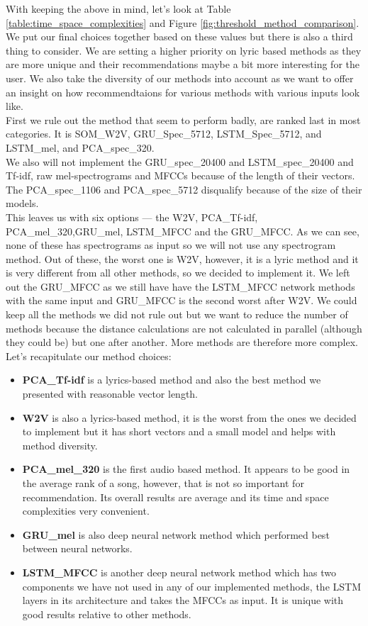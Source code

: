 With keeping the above in mind, let's look at Table \ref{table:time_space_complexities} and Figure \ref{fig:threshold_method_comparison}. We put our final choices together based on these values but there is also a third thing to consider. We are setting a higher priority on lyric based methods as they are more unique and their recommendations maybe a bit more interesting for the user. We also take the diversity of our methods into account as we want to offer an insight on how recommendtaions for various methods with various inputs look like. \\
First we rule out the method that seem to perform badly, are ranked last in most categories. It is SOM\_W2V, GRU\_Spec\_5712, LSTM\_Spec\_5712, and LSTM\_mel, and PCA\_spec\_320. \\
We also will not implement the GRU\_spec\_20400 and LSTM\_spec\_20400 and Tf-idf, raw mel-spectrograms and MFCCs because of the length of their vectors. The PCA\_spec\_1106 and PCA\_spec\_5712 disqualify because of the size of their models. \\
This leaves us with six options --- the W2V, PCA\_Tf-idf, PCA\_mel\_320,GRU\_mel, LSTM\_MFCC and the GRU\_MFCC. As we can see, none of these has spectrograms as input so we will not use any spectrogram method. Out of these, the worst one is W2V, however, it is a lyric method and it is very different from all other methods, so we decided to implement it. We left out the GRU\_MFCC as we still have have the LSTM\_MFCC network methods with the same input and GRU\_MFCC is the second worst after W2V. We could keep all the methods we did not rule out but we want to reduce the number of methods because the distance calculations are not calculated in parallel (although they could be) but one after another. More methods are therefore more complex. \\
Let's recapitulate our method choices:
\begin{itemize}
    \item \textbf{PCA\_Tf-idf} is a lyrics-based method and also the best method we presented with reasonable vector length.
    \item \textbf{W2V} is also a lyrics-based method, it is the worst from the ones we decided to implement but it has short vectors and a small model and helps with method diversity.
    \item \textbf{PCA\_mel\_320} is the first audio based method. It appears to be good in the average rank of a song, however, that is not so important for recommendation. Its overall results are average and its time and space complexities very convenient.
    \item \textbf{GRU\_mel} is also deep neural network method which performed best between neural networks.
    \item \textbf{LSTM\_MFCC} is another deep neural network method which has two components we have not used in any of our implemented methods, the LSTM layers in its architecture and takes the MFCCs as input. It is unique with good results relative to other methods. 
\end{itemize}

